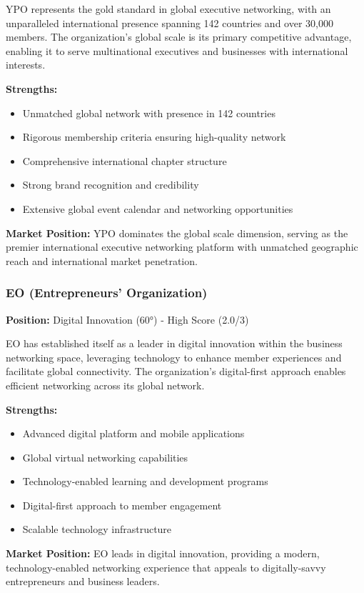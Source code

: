 YPO represents the gold standard in global executive networking, with an unparalleled international presence spanning 142 countries and over 30,000 members. The organization's global scale is its primary competitive advantage, enabling it to serve multinational executives and businesses with international interests.

\textbf{Strengths:}
\begin{itemize}
    \item Unmatched global network with presence in 142 countries
    \item Rigorous membership criteria ensuring high-quality network
    \item Comprehensive international chapter structure
    \item Strong brand recognition and credibility
    \item Extensive global event calendar and networking opportunities
\end{itemize}

\textbf{Market Position:} YPO dominates the global scale dimension, serving as the premier international executive networking platform with unmatched geographic reach and international market penetration.

\subsubsection{EO (Entrepreneurs' Organization)}
\textbf{Position:} Digital Innovation (60°) - High Score (2.0/3)

EO has established itself as a leader in digital innovation within the business networking space, leveraging technology to enhance member experiences and facilitate global connectivity. The organization's digital-first approach enables efficient networking across its global network.

\textbf{Strengths:}
\begin{itemize}
    \item Advanced digital platform and mobile applications
    \item Global virtual networking capabilities
    \item Technology-enabled learning and development programs
    \item Digital-first approach to member engagement
    \item Scalable technology infrastructure
\end{itemize}

\textbf{Market Position:} EO leads in digital innovation, providing a modern, technology-enabled networking experience that appeals to digitally-savvy entrepreneurs and business leaders.

